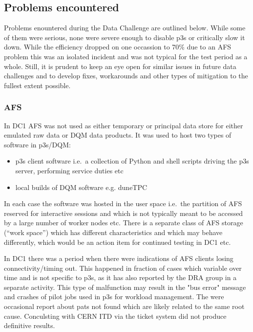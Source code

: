 \documentclass[pdftex,12pt,letter]{article}
\begin{document}
\subsection{Problems encountered}
\label{sec:p3s_issues}
Problems enountered during the Data Challenge are outlined below. While some of them were serious, none
were severe enough to disable p3s or critically slow it down. While the efficiency dropped on one occassion to 70\% due to an AFS problem
this was an isolated incident and was not typical for the test period as a whole. Still, it is prudent to keep an eye
open for similar issues in future data challenges and to develop fixes, workarounds and other types of mitigation
to the fullest extent possible.

\subsubsection{AFS}

In DC1 AFS was not used as either temporary or principal data store for either emulated raw data or DQM data products.
It was used to host two types of software in p3s/DQM:
\begin{itemize}
\item p3s client software i.e.~a collection of Python and shell scripts driving the p3s server, performing service duties etc
\item local builds of DQM software e.g. duneTPC
\end{itemize}

\noindent In each case the software was hosted in the user space i.e.~the partition of AFS reserved for interactive sessions
and which is not typically meant to be accessed by a large number of worker nodes etc. There is a separate class
of AFS storage (``work space'') which has different characteristics and which may behave differently, which would
be an action item for continued testing in DC1 etc.

In DC1 there was a period when there were indications of AFS clients losing connectivity/timing out.
This happened in fraction of cases which variable over time and is not specific to p3s, as it has also reported
by the DRA group in a separate activity. This type of malfunction may result in the "bus error" message and crashes of
pilot jobs used in p3s for workload management. The were occasional report about pats not found which are likely
related to the same root cause. Conculsting with CERN ITD via the ticket system did not produce definitive results.
\end{document}
